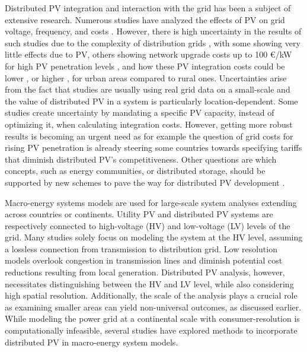 \documentclass[review]{elsarticle}
\begin{document}
Distributed PV integration and interaction with the grid has been a subject of extensive research. Numerous studies have analyzed the effects of PV on grid voltage, frequency, and costs \cite{ gupta_2021, alboaouh_2020, karimi_2016, gandhi_2020, olowu_2018} . However, there is high uncertainty in the results of such studies due to the complexity of distribution grids \cite{ burger_2019, horowitz_2018distribution} , with some showing very little effects due to PV, others showing network upgrade costs up to 100 €/kW for high PV penetration levels \cite{lumbreras_2018, horowitz_2018, cohen_2016effects, cohen_2016effects2} , and how these PV integration costs could be lower \cite{gupta_2021} , or higher \cite{fernandez_2010} , for urban areas compared to rural ones. Uncertainties arise from the fact that studies are usually using real grid data on a small-scale and the value of distributed PV in a system is particularly location-dependent. Some studies create uncertainty by mandating a specific PV capacity, instead of optimizing it, when calculating integration costs. However, getting more robust results is becoming an urgent need as for example the question of grid costs for rising PV penetration is already steering some countries towards specifying tariffs that diminish distributed PV's competitiveness. Other questions are which concepts, such as energy communities, or distributed storage, should be supported by new schemes to pave the way for distributed PV development \cite{IEAPVPS_2021}.

Macro-energy systems models are used for large-scale system analyses extending across countries or continents. Utility PV and distributed PV systems are respectively connected to high-voltage (HV) and low-voltage (LV) levels of the grid. Many studies solely focus on modeling the system at the HV level, assuming a lossless connection from transmission to distribution grid. Low resolution models overlook congestion in transmission lines and diminish potential cost reductions resulting from local generation. Distributed PV analysis, however, necessitates distinguishing between the HV and LV level, while also considering high spatial resolution. Additionally, the scale of the analysis plays a crucial role as examining smaller areas can yield non-universal outcomes, as discussed earlier. While modeling the power grid at a continental scale with consumer-resolution is computationally infeasible, several studies have explored methods to incorporate distributed PV in macro-energy system models.
\end{document}
